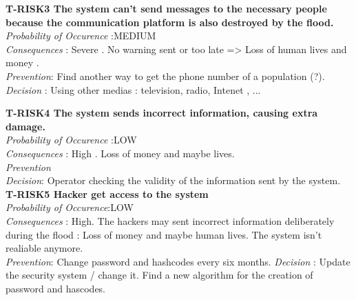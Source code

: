 	\textbf{ T-RISK3 The system can't send messages to the necessary people because the communication platform is also destroyed by the flood.} \\
	\textit{Probability of Occurence} :MEDIUM\\
	\textit{Consequences} : Severe . No warning sent or too late => Loss of human lives and money .\\
	\textit{Prevention}: Find another way to get the phone number of a population (?). \\
	\textit{Decision} : Using other medias : television, radio, Intenet , ...
	
	\textbf{ T-RISK4 The system sends incorrect information, causing extra damage.} \\
	\textit{Probability of Occurence} :LOW\\
	\textit{Consequences} : High . Loss of money and maybe lives.\\
	\textit{Prevention} \\
	\textit{Decision}: Operator checking the validity of the information sent by the system. \\
	
	\textbf{ T-RISK5 Hacker get access to the system} \\
	\textit{Probability of Occurence}:LOW \\
	\textit{Consequences} : High. The hackers may sent incorrect information deliberately during the flood : Loss of money and maybe human lives. The system isn't realiable anymore. \\
	\textit{Prevention}: Change password and hashcodes every six months.
	\textit{Decision} : Update the security system / change it. Find a new algorithm for the creation of password and hascodes. \\
